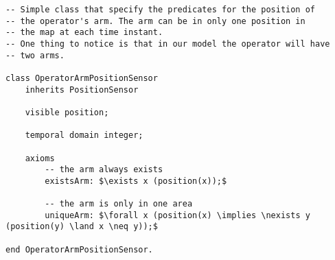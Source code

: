 \begin{lstlisting}[fontadjust, mathescape, frame=single] 
-- Simple class that specify the predicates for the position of
-- the operator's arm. The arm can be in only one position in 
-- the map at each time instant. 
-- One thing to notice is that in our model the operator will have
-- two arms.

class OperatorArmPositionSensor
    inherits PositionSensor

    visible position;

    temporal domain integer;

    axioms
        -- the arm always exists
        existsArm: $\exists x (position(x));$

        -- the arm is only in one area
        uniqueArm: $\forall x (position(x) \implies \nexists y (position(y) \land x \neq y));$

end OperatorArmPositionSensor.
\end{lstlisting}